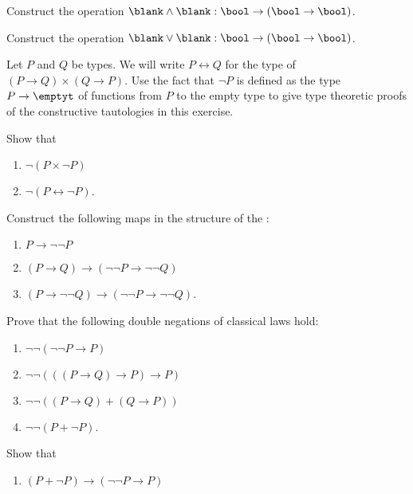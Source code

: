 \begin{exercises}
\begin{subexenum}
  \item Construct the  operation $\blank\land\blank : \bool\to(\bool\to\bool)$.
  \item Construct the  operation $\blank\lor\blank : \bool\to(\bool\to\bool)$.
  \end{subexenum}
  \exitem Let $P$ and $Q$ be types. We will write $P\leftrightarrow Q$ for the type of  ${(P\to Q)}\times {(Q\to P)}$. Use the fact that $\neg P$ is defined as the type $P\to\emptyt$ of functions from $P$ to the empty type to give type theoretic proofs of the constructive tautologies in this exercise.\label{ex:dne-dec}
  \begin{subexenum}
  \item \label{ex:no-fixed-points-neg}Show that
    \begin{enumerate}
    \item $\neg(P\times \neg P)$
    \item $\neg(P\leftrightarrow \neg P)$.
    \end{enumerate}
  \item \label{ex:dn-monad}Construct the following maps in the structure of the :
    \begin{enumerate}
    \item $P\to\neg\neg P$
    \item $(P\to Q)\to(\neg\neg P\to\neg\neg Q)$
    \item $(P\to \neg\neg Q)\to (\neg\neg P \to\neg\neg Q)$.
    \end{enumerate}
  \item Prove that the following double negations of classical laws hold:
    \begin{enumerate}
    \item $\neg\neg(\neg\neg P \to P)$
    \item $\neg\neg(((P\to Q)\to P)\to P)$
    \item $\neg\neg((P\to Q)+(Q\to P))$
    \item $\neg\neg(P+\neg P)$.
    \end{enumerate}
  \item \label{ex:dne-is-decidable}Show that
    \begin{enumerate}
    \item $(P+\neg P)\to(\neg\neg P\to P)$

\end{enumerate}
\end{subexenum}
\end{exercises}

